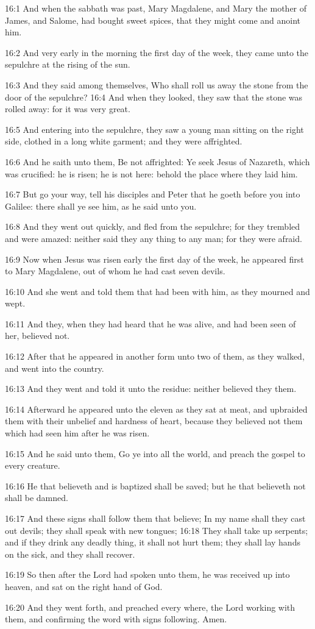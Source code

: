 16:1 And when the sabbath was past, Mary Magdalene, and Mary the mother of James, and Salome, had bought sweet spices, that they might come and anoint him.

16:2 And very early in the morning the first day of the week, they came unto the sepulchre at the rising of the sun.

16:3 And they said among themselves, Who shall roll us away the stone from the door of the sepulchre?  16:4 And when they looked, they saw that the stone was rolled away: for it was very great.

16:5 And entering into the sepulchre, they saw a young man sitting on the right side, clothed in a long white garment; and they were affrighted.

16:6 And he saith unto them, Be not affrighted: Ye seek Jesus of Nazareth, which was crucified: he is risen; he is not here: behold the place where they laid him.

16:7 But go your way, tell his disciples and Peter that he goeth before you into Galilee: there shall ye see him, as he said unto you.

16:8 And they went out quickly, and fled from the sepulchre; for they trembled and were amazed: neither said they any thing to any man; for they were afraid.

16:9 Now when Jesus was risen early the first day of the week, he appeared first to Mary Magdalene, out of whom he had cast seven devils.

16:10 And she went and told them that had been with him, as they mourned and wept.

16:11 And they, when they had heard that he was alive, and had been seen of her, believed not.

16:12 After that he appeared in another form unto two of them, as they walked, and went into the country.

16:13 And they went and told it unto the residue: neither believed they them.

16:14 Afterward he appeared unto the eleven as they sat at meat, and upbraided them with their unbelief and hardness of heart, because they believed not them which had seen him after he was risen.

16:15 And he said unto them, Go ye into all the world, and preach the gospel to every creature.

16:16 He that believeth and is baptized shall be saved; but he that believeth not shall be damned.

16:17 And these signs shall follow them that believe; In my name shall they cast out devils; they shall speak with new tongues; 16:18 They shall take up serpents; and if they drink any deadly thing, it shall not hurt them; they shall lay hands on the sick, and they shall recover.

16:19 So then after the Lord had spoken unto them, he was received up into heaven, and sat on the right hand of God.

16:20 And they went forth, and preached every where, the Lord working with them, and confirming the word with signs following. Amen.

